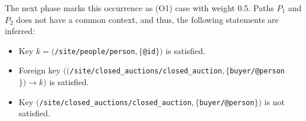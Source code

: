 The next phase marks this occurrence as (O1) case with weight 0.5. Paths $P_1$ and $P_2$ does not have a common context, and thus, the following statements are inferred:

\begin{itemize}
\item Key $k = ($\texttt{/site/people/person}$, \{$\texttt{@id}$\})$ is satisfied.
\item Foreign key $(($\texttt{/site/closed\_auctions/closed\_auction}$, \{$\texttt{buyer/@person}$\}) \rightarrow k)$ is satisfied.
\item Key $($\texttt{/site/closed\_auctions/closed\_auction}$, \{$\texttt{buyer/@person}$\})$ is not satisfied.
\end{itemize}